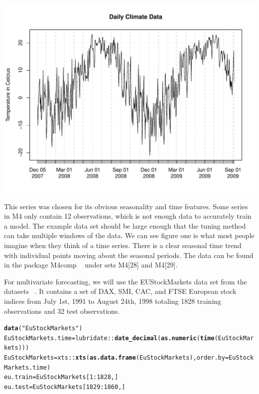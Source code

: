 \documentclass[12pt]{article}\usepackage[]{graphicx}\usepackage[]{color}
\makeatletter
\def\maxwidth{ %
  \ifdim\Gin@nat@width>\linewidth
    \linewidth
  \else
    \Gin@nat@width
  \fi
}
\newcommand{\hlnum}[1]{\textcolor[rgb]{0.686,0.059,0.569}{#1}}%
\newcommand{\hlstr}[1]{\textcolor[rgb]{0.192,0.494,0.8}{#1}}%
\newcommand{\hlopt}[1]{\textcolor[rgb]{0,0,0}{#1}}%
\newcommand{\hlstd}[1]{\textcolor[rgb]{0.345,0.345,0.345}{#1}}%
\newcommand{\hlkwb}[1]{\textcolor[rgb]{0.69,0.353,0.396}{#1}}%
\newcommand{\hlkwc}[1]{\textcolor[rgb]{0.333,0.667,0.333}{#1}}%
\newcommand{\hlkwd}[1]{\textcolor[rgb]{0.737,0.353,0.396}{\textbf{#1}}}%
\newenvironment{kframe}{%
 \def\at@end@of@kframe{}%
 \ifinner\ifhmode%
  \def\at@end@of@kframe{\end{minipage}}%
  \begin{minipage}{\columnwidth}%
 \fi\fi%
 \def\FrameCommand##1{\hskip\@totalleftmargin \hskip-\fboxsep
 \colorbox{shadecolor}{##1}\hskip-\fboxsep
     \hskip-\linewidth \hskip-\@totalleftmargin \hskip\columnwidth}%
 \MakeFramed {\advance\hsize-\width
   \@totalleftmargin\z@ \linewidth\hsize
   \@setminipage}}%
 {\par\unskip\endMakeFramed%
 \at@end@of@kframe}
\newenvironment{knitrout}{}{} %
\theoremstyle{definition}
\newcommand\code{\@codex}
\def\@codex#1{{\normalfont\ttfamily\hyphenchar\font=-1 #1}}
\newcommand{\pkg}[1]{{\fontseries{b}\selectfont #1}}
\makeatother
\begin{document}
\begin{knitrout}
\color{fgcolor}

{\centering \includegraphics[width=\maxwidth]{figure/plot_dat_weather-1} 

}



\end{knitrout}
\doublespacing
This series was chosen for its obvious seasonality and time features. Some series in M4 only contain 12 observations, which is not enough data to accurately train a model. The example data set should be large enough that the tuning method can take multiple windows of the data. We can see figure one is what most people imagine when they think of a time series. There is a clear seasonal time trend with individual points moving about the seasonal periods. The data can be found in the package \pkg{M4comp} ~\cite{m4comp} under sets \code{M4[28]} and \code{M4[29]}. 

For multivariate forecasting, we will use the EUStockMarkets data set from the \pkg{datasets} ~\cite{datasets}. It contains a set of DAX, SMI, CAC, and FTSE European stock indices from July 1st, 1991 to August 24th, 1998 totaling 1828 training observations and 32 test observations.

\begin{knitrout}
\color{fgcolor}\begin{kframe}
\begin{alltt}
\hlkwd{data}\hlstd{(}\hlstr{"EuStockMarkets"}\hlstd{)}
\hlstd{EuStockMarkets.time} \hlkwb{=} \hlstd{lubridate}\hlopt{::}\hlkwd{date_decimal}\hlstd{(}\hlkwd{as.numeric}\hlstd{(}\hlkwd{time}\hlstd{(EuStockMarkets)))}
\hlstd{EuStockMarkets}  \hlkwb{=} \hlstd{xts}\hlopt{::}\hlkwd{xts}\hlstd{(}\hlkwd{as.data.frame}\hlstd{(EuStockMarkets),} \hlkwc{order.by} \hlstd{= EuStockMarkets.time)}
\hlstd{eu.train} \hlkwb{=} \hlstd{EuStockMarkets[}\hlnum{1}\hlopt{:}\hlnum{1828}\hlstd{,]}
\hlstd{eu.test} \hlkwb{=} \hlstd{EuStockMarkets[}\hlnum{1829}\hlopt{:}\hlnum{1860}\hlstd{,]}
\end{alltt}
\end{kframe}
\end{knitrout}
\end{document}
